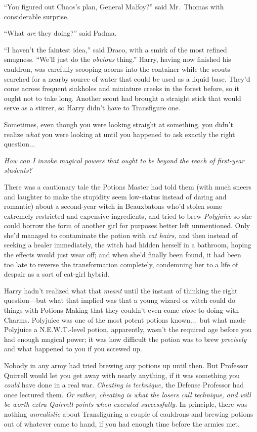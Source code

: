“You figured out Chaos’s plan, General Malfoy?” said Mr.~Thomas
with considerable surprise.

“What \emph{are} they doing?” said Padma.

“I haven’t the faintest idea,” said Draco, with a smirk of the
most refined smugness. “We’ll just do the \emph{obvious}
thing.”
\sbreak
Harry, having now finished his cauldron, was carefully scooping
acorns into the container while the scouts searched for a nearby
source of water that could be used as a liquid base. They’d come
across frequent sinkholes and miniature creeks in the forest
before, so it ought not to take long. Another scout had brought a
straight stick that would serve as a stirrer, so Harry didn’t have
to Transfigure one.

Sometimes, even though you were looking straight at something,
you didn’t realize \emph{what} you were looking at until you
happened to ask exactly the right question...

\emph{How can I invoke magical powers that ought to be beyond the
reach of first-year students?}

There was a cautionary tale the Potions Master had told them
(with much sneers and laughter to make the stupidity seem
low-status instead of daring and romantic) about a second-year
witch in Beauxbatons who’d stolen some extremely restricted and
expensive ingredients, and tried to brew \emph{Polyjuice} so she
could borrow the form of another girl for purposes better left
unmentioned. Only she’d managed to contaminate the potion with
\emph{cat hairs,} and then instead of seeking a healer immediately,
the witch had hidden herself in a bathroom, hoping the effects
would just wear off; and when she’d finally been found, it had been
too late to reverse the transformation completely, condemning her
to a life of despair as a sort of cat-girl hybrid.

Harry hadn’t realized what that \emph{meant} until the instant
of thinking the right question—but what that implied was that a
young wizard or witch could do things with Potions-Making that they
couldn’t even come \emph{close} to doing with Charms. Polyjuice was
one of the most potent potions known...\ but what made Polyjuice a
N.E.W.T.-level potion, apparently, wasn’t the required age before
you had enough magical power; it was how difficult the potion was
to brew \emph{precisely} and what happened to you if you screwed
up.

Nobody in any army had tried brewing any potions up until then.
But Professor Quirrell would let you get away with nearly anything,
if it was something you \emph{could} have done in a real war.
\emph{Cheating is technique,} the Defense Professor had once
lectured them. \emph{Or rather, cheating is what the losers call
technique, and will be worth extra Quirrell points when executed
successfully.} In principle, there was nothing
\emph{unrealistic} about Transfiguring a couple of cauldrons and
brewing potions out of whatever came to hand, if you had enough
time before the armies met.

